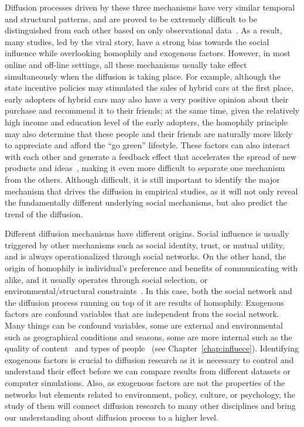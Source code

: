 \documentclass[phd,tocprelim]{cornell}
\begin{document}
Diffusion processes driven by these three mechanisms have very similar temporal and structural patterns, and are proved to be extremely difficult to be distinguished from each other based on only observational data~\cite{Aral:2009,Shalizi-2011}. As a result, many studies, led by the viral story, have a strong bias towards the social influence while overlooking homophily and exogenous factors. However, in most online and off-line settings, all these mechanisms usually take effect simultaneously when the diffusion is taking place. For example, although the state incentive policies may stimulated the sales of hybrid cars at the first place, early adopters of hybrid cars may also have a very positive opinion about their purchase and recommend it to their friends; at the same time, given the relatively high income and education level of the early adopters, the homophily principle may also determine that these people and their friends are naturally more likely to appreciate and afford the ``go green'' lifestyle. These factors can also interact with each other and generate a feedback effect that accelerates the spread of new products and ideas~\cite{Crandall:2008}, making it even more difficult to separate one mechanism from the others. Although difficult, it is still important to identify the major mechanism that drives the diffusion in empirical studies, as it will not only reveal the fundamentally different underlying social mechanisms, but also predict the trend of the diffusion.

Different diffusion mechanisms have different origins. Social influence is usually triggered by other mechanisms such as social identity, trust, or mutual utility, and is always operationalized through social networks. On the other hand, the origin of homophily is individual's preference and benefits of communicating with alike, and it usually operates through social selection, or environmental/structural constraints~\cite{kossinets-2008}. In this case, both the social network and the diffusion process running on top of it are results of homophily. Exogenous factors are confound variables that are independent from the social network. Many things can be confound variables, some are external and environmental such as geographical conditions and seasons, some are more internal such as the quality of content~\cite{crane:2008} and types of people~\cite{Wu-Twitter-2011} (see Chapter~\ref{chap:influece}). Identifying exogenous factors is crucial to diffusion research as it is necessary to control and understand their effect before we can compare results from different datasets or computer simulations. Also, as exogenous factors are not the properties of the networks but elements related to environment, policy, culture, or psychology, the study of them will connect diffusion research to many other disciplines and bring our understanding about diffusion process to a higher level.
\end{document}
